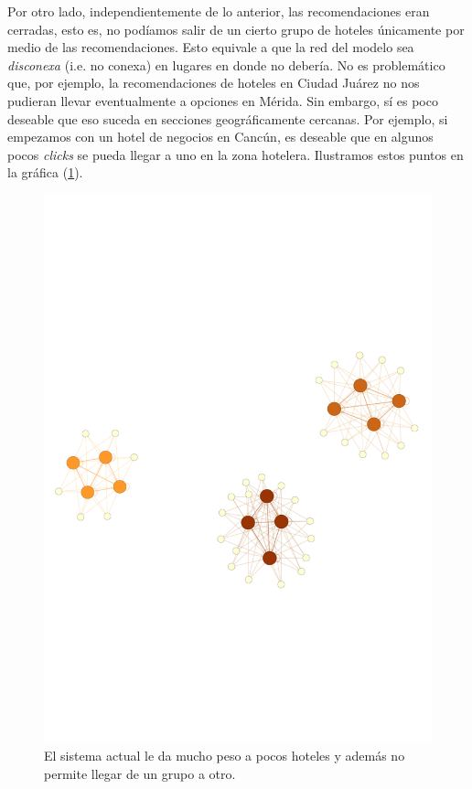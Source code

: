 \documentclass[12pt]{report}
\begin{document}
Por otro lado, independientemente de lo anterior, las recomendaciones eran cerradas, esto es, no podíamos salir de un cierto grupo de hoteles únicamente por medio de las recomendaciones. Esto equivale a que la red del modelo sea \emph{disconexa} (i.e. no conexa) en lugares en donde no debería. No es problemático que, por ejemplo, la recomendaciones de hoteles en Ciudad Juárez no nos pudieran llevar eventualmente a opciones en Mérida. Sin embargo, sí es poco deseable que eso suceda en secciones geográficamente cercanas. Por ejemplo, si empezamos con un hotel de negocios en Cancún, es deseable que en algunos pocos \emph{clicks} se pueda llegar a uno en la zona hotelera. Ilustramos estos puntos en la gráfica (\ref{fig:disconexo}).
\begin{figure}[h]
	\centering
	\includegraphics[width=\textwidth,
		trim = 0 220 0 220, clip
		]{imagenes/disconexo.pdf}
	\caption{\label{fig:disconexo} El sistema actual le da mucho peso a pocos hoteles y además no permite llegar de un grupo a otro.}
\end{figure}
\end{document}
